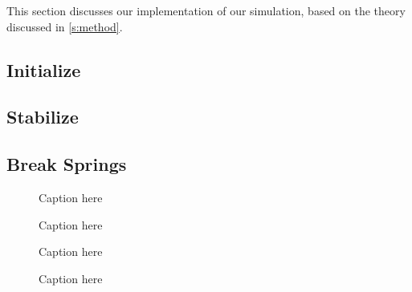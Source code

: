 This section discusses our implementation of our simulation, based on the theory discussed in \cref{s:method}. 

\subsection{Initialize}

\subsection{Stabilize}

\subsection{Break Springs}

\begin{figure}
	\centering
	\resizebox{0.9\columnwidth}{!}{%
		\initialGrid
	}
	\caption{Caption here}
	\label{fig:1:}
\end{figure}

\begin{figure}
	\centering
	\resizebox{0.9\columnwidth}{!}{%
		\stabilizedInitialGrid
	}
	\caption{Caption here}
	\label{fig:2:}
\end{figure}

\begin{figure}
	\centering
	\resizebox{0.9\columnwidth}{!}{%
		\cutGrid
	}
	\caption{Caption here}
	\label{fig:3:}
\end{figure}

\begin{figure}
	\centering
	\resizebox{0.9\columnwidth}{!}{%
		\stabilizedCutGrid
	}
	\caption{Caption here}
	\label{fig:4:}
\end{figure}